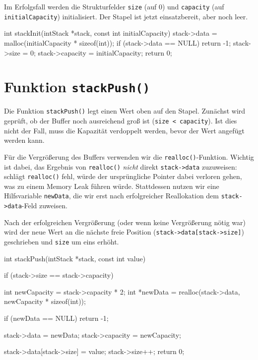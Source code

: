 Im Erfolgsfall werden die Strukturfelder \texttt{size} (auf 0) und
\texttt{capacity} (auf \texttt{initialCapacity}) initialisiert.
Der Stapel ist jetzt einsatzbereit, aber noch leer.

\begin{codebox}[lang=c, fontsize=\small]
int stackInit(intStack *stack, const int initialCapacity) {
    stack->data = malloc(initialCapacity * sizeof(int));
    if (stack->data == NULL) {
        return -1;
    }
    stack->size = 0;
    stack->capacity = initialCapacity;
    return 0;
}
\end{codebox}

\section*{Funktion \texttt{stackPush()}}

Die Funktion \texttt{stackPush()} legt einen Wert oben auf den Stapel.
Zunächst wird geprüft, ob der Buffer noch ausreichend groß ist
(\texttt{size < capacity}). Ist dies nicht der Fall, muss die
Kapazität verdoppelt werden, bevor der Wert angefügt werden kann.

Für die Vergrößerung des Buffers verwenden wir die
\texttt{realloc()}-Funktion. Wichtig ist dabei, das Ergebnis von
\texttt{realloc()} \textit{nicht} direkt
\texttt{stack->data} zuzuweisen: schlägt \texttt{realloc()}
fehl, würde der ursprüngliche Pointer dabei verloren gehen, was zu einem
Memory Leak führen würde. Stattdessen nutzen wir eine Hilfsvariable
\texttt{newData}, die wir erst nach erfolgreicher Reallokation dem
\texttt{stack->data}-Feld zuweisen.

Nach der erfolgreichen Vergrößerung (oder wenn keine Vergrößerung nötig war)
wird der neue Wert an die nächste freie Position
(\texttt{stack->data[stack->size]}) geschrieben und
\texttt{size} um eins erhöht.

\begin{codebox}[lang=c, fontsize=\small]
int stackPush(intStack *stack, const int value) {
    if (stack->size == stack->capacity) {
        int newCapacity = stack->capacity * 2;
        int *newData = realloc(stack->data, newCapacity * sizeof(int));

        if (newData == NULL) {
            return -1;
        }

        stack->data = newData;
        stack->capacity = newCapacity;
    }

    stack->data[stack->size] = value;
    stack->size++;
    return 0;
}
\end{codebox}

